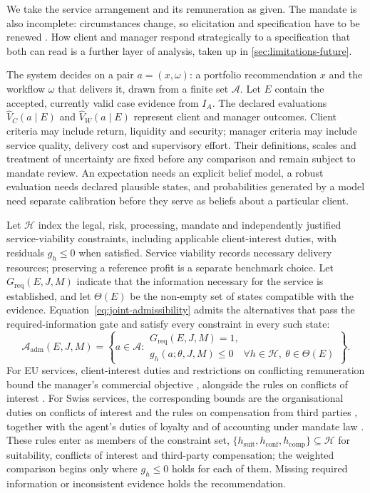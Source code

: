 \documentclass[oneside,10pt,english]{swissi}
\begin{document}
We take the service arrangement and its remuneration as given. The mandate is also incomplete: circumstances change, so elicitation and specification have to be renewed \parencite{grossmanhart1986,hartmoore1990}. How client and manager respond strategically to a specification that both can read is a further layer of analysis, taken up in \cref{sec:limitations-future}.

The system decides on a pair $a=(x,\omega)$: a portfolio recommendation $x$ and the workflow $\omega$ that delivers it, drawn from a finite set $\mathcal A$. Let $E$ contain the accepted, currently valid case evidence from $I_A$. The declared evaluations $\widehat V_C(a\mid E)$ and $\widehat V_W(a\mid E)$ represent client and manager outcomes. Client criteria may include return, liquidity and security; manager criteria may include service quality, delivery cost and supervisory effort. Their definitions, scales and treatment of uncertainty are fixed before any comparison and remain subject to mandate review. An expectation needs an explicit belief model, a robust evaluation needs declared plausible states, and probabilities generated by a model need separate calibration before they serve as beliefs about a particular client.

Let $\mathcal H$ index the legal, risk, processing, mandate and independently justified service-viability constraints, including applicable client-interest duties, with residuals $g_h\le0$ when satisfied. Service viability records necessary delivery resources; preserving a reference profit is a separate benchmark choice. Let $G_{\mathrm{req}}(E,J,M)$ indicate that the information necessary for the service is established, and let $\Theta(E)$ be the non-empty set of states compatible with the evidence. Equation~\eqref{eq:joint-admissibility} admits the alternatives that pass the required-information gate and satisfy every constraint in every such state:
\begin{equation}
 \mathcal A_{\mathrm{adm}}(E,J,M)=\left\{a\in\mathcal A:
 \begin{array}{l}
 G_{\mathrm{req}}(E,J,M)=1,\\
 g_h(a;\theta,J,M)\le0\quad\forall h\in\mathcal H,\ \theta\in\Theta(E)
 \end{array}\right\}.
 \label{eq:joint-admissibility}
\end{equation}
For EU services, client-interest duties and restrictions on conflicting remuneration bound the manager's commercial objective \parencite[paras.~1 and 10]{esma2026mifid24}, alongside the rules on conflicts of interest \parencite[art.~23]{europeanunion2014mifidii}. For Swiss services, the corresponding bounds are the organisational duties on conflicts of interest and the rules on compensation from third parties \parencite[arts.~25--26]{switzerland2018finsa}, together with the agent's duties of loyalty and of accounting under mandate law \parencite[arts.~398 and 400]{switzerland1911co}. These rules enter as members of the constraint set, $\{h_{\mathrm{suit}},h_{\mathrm{conf}},h_{\mathrm{comp}}\}\subseteq\mathcal H$ for suitability, conflicts of interest and third-party compensation; the weighted comparison begins only where $g_h\le0$ holds for each of them. Missing required information or inconsistent evidence holds the recommendation.
\end{document}
